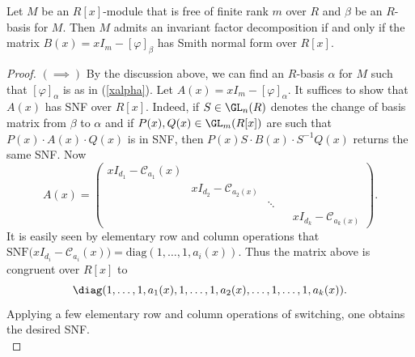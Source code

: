 \begin{theorem} \label{RCFEquivSNF} Let $ M $ be an $ R[x] $-module that is free of finite rank $ m $ over $ R$ and  $ \beta $ be an $ R$-basis for $ M $.  Then $M $ admits an invariant factor decomposition if and only if the matrix   $   B(x) =  x I_{m}  -   [    \varphi ] _{     \beta }     $ has Smith normal form over $ R[x] $. 
\end{theorem} 

\begin{proof} $( \! \implies \! ) $ By the discussion above, we can find an $ R$-basis $ \alpha $ for $ M $ such that   $[\varphi]_{\alpha} $ is as in (\ref{xalpha}).  Let $ A(x) = xI_{m} - [\varphi]_{\alpha} $. It suffices to show that $ A(x) $ has SNF over $ R[x] $.  Indeed, if $ S \in \GL_{n}(R)  $ denotes the change of  basis   matrix from $ \beta $ to $ \alpha $  and if $ P(x), Q(x) \in \GL_{m}(R[x]) $ are such  that  $ P(x)   \cdot A(x)  \cdot Q(x) $ is in SNF,  then $ P(x) S  \cdot B(x) \cdot S^{-1} Q(x) $ returns  the same SNF.  Now  
 $$  A(x)  = \begin{pmatrix}   xI_{d_{1}}  -  \mathcal{C}_{a_{1}}(x)  &   &    &    \\[0.2em]
  &   x I_{ d_{2}}  -    \mathcal{C}_{a_{2}(x)} &    &      &       \\[0.2em]
&    &    \ddots    &  &      \\[0.2em]
&                       &                                      &  &       xI_{d_{k}}  -   \mathcal{C}_{a_{k}(x)}      
\end{pmatrix}    . $$   
It is easily seen by elementary row and  column operations that $ \mathrm{SNF}\big (xI_{d_{i}} -  \mathcal{C}_{a_{i}}(x)\big ) = \mathrm{diag} (1,\ldots,1,a_{i}(x)) $. Thus the matrix above is congruent over $ R[x] $ to $$ \diag( 1,  \ldots,   1   ,  a_{1}(x) , 1 , \ldots, 1 ,  a_{2}(x) , \ldots, 1, \ldots,  1 ,   a_ { k }     ( x  )   ) . $$   
Applying a few elementary row and column operations of switching, one obtains the desired SNF. \\         



\end{proof}

